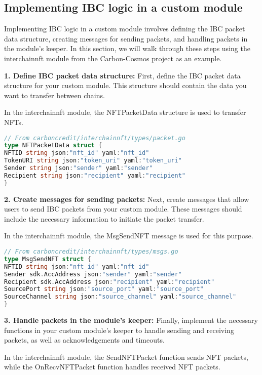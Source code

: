 \documentclass{article}
\begin{document}
\subsection{Implementing IBC logic in a custom module}

Implementing IBC logic in a custom module involves defining the IBC packet data structure, creating messages for sending packets, and handling packets in the module's keeper. In this section, we will walk through these steps using the interchainnft module from the Carbon-Cosmos project as an example.

\textbf{1. Define IBC packet data structure:} First, define the IBC packet data structure for your custom module. This structure should contain the data you want to transfer between chains.

In the interchainnft module, the NFTPacketData structure is used to transfer NFTs.

\begin{lstlisting}[language=Go]
// From carboncredit/interchainnft/types/packet.go
type NFTPacketData struct {
NFTID string json:"nft_id" yaml:"nft_id"
TokenURI string json:"token_uri" yaml:"token_uri"
Sender string json:"sender" yaml:"sender"
Recipient string json:"recipient" yaml:"recipient"
}
\end{lstlisting}

\textbf{2. Create messages for sending packets:} Next, create messages that allow users to send IBC packets from your custom module. These messages should include the necessary information to initiate the packet transfer.

In the interchainnft module, the MsgSendNFT message is used for this purpose.

\begin{lstlisting}[language=Go]
// From carboncredit/interchainnft/types/msgs.go
type MsgSendNFT struct {
NFTID string json:"nft_id" yaml:"nft_id"
Sender sdk.AccAddress json:"sender" yaml:"sender"
Recipient sdk.AccAddress json:"recipient" yaml:"recipient"
SourcePort string json:"source_port" yaml:"source_port"
SourceChannel string json:"source_channel" yaml:"source_channel"
}
\end{lstlisting}

\textbf{3. Handle packets in the module's keeper:} Finally, implement the necessary functions in your custom module's keeper to handle sending and receiving packets, as well as acknowledgements and timeouts.

In the interchainnft module, the SendNFTPacket function sends NFT packets, while the OnRecvNFTPacket function handles received NFT packets.
\end{document}
